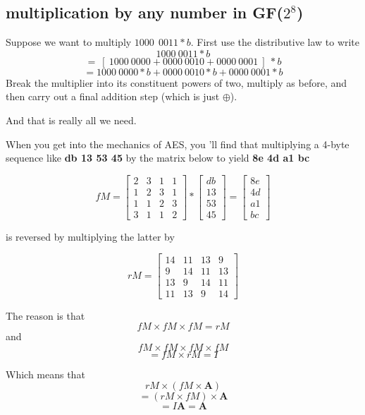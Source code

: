 \documentclass[11pt, oneside]{article}
\begin{document}
\subsection*{multiplication by any number in GF($2^8$)}
Suppose we want to multiply $ 1000 \  \  0011 * b$.  First use the distributive law to write
\[ 1000 \   0011 * b \]
\[ = \ [ \ 1000 \   0000  + 0000 \  0010  + 0000 \   0001 \ ] \ * b \]
\[ = 1000 \  0000 * b + 0000 \  0010 * b + 0000 \  0001 * b \]
Break the multiplier into its constituent powers of two, multiply as before, and then carry out a final  addition step (which is just $\oplus$).

And that is really all we need.

When you get into the mechanics of AES, you 'll find that multiplying a 4-byte sequence like \textbf{db 13 53 45} by the matrix below to yield \textbf{8e 4d a1 bc} 

\[ fM =
\begin{bmatrix}
2 & 3 & 1 & 1 \\
1 & 2 & 3 & 1 \\
1 & 1 & 2 & 3 \\
3 & 1 & 1 & 2
\end{bmatrix} 
*
\begin{bmatrix}
db \\
13 \\
53 \\
45
\end{bmatrix} 
=
\begin{bmatrix}
8e \\
4d \\
a1 \\
bc
\end{bmatrix} 
\]

is reversed by multiplying the latter by

\[ rM = 
\begin{bmatrix}
14 &11 &13 & 9 \\
9 &14 &11 & 13 \\
13 & 9 &14 & 11 \\
11 &13 & 9 & 14
\end{bmatrix} \]

The reason is that 
\[ fM \times fM \times fM = rM \]
and
\[ fM \times fM \times fM \times fM \]
\[ = fM \times rM = I \]

Which means that
\[ rM \times (fM \times \mathbf{A}) \]
\[ = ( rM \times fM) \times \mathbf{A} \]
\[ =I \mathbf{A} =  \mathbf{A} \]
\end{document}
